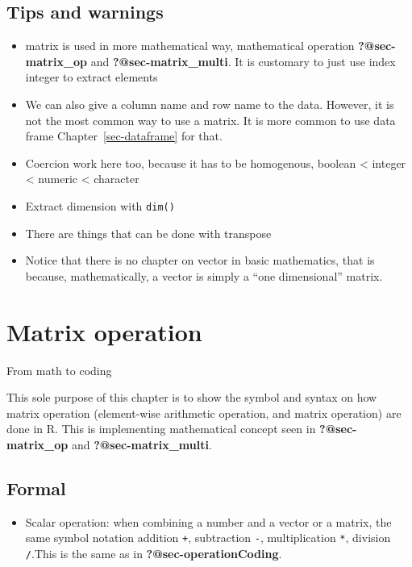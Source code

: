 \documentclass[
  letterpaper,
  DIV=11,
  numbers=noendperiod]{scrreprt}
\providecommand{\tightlist}{%
  \setlength{\itemsep}{0pt}\setlength{\parskip}{0pt}}
\begin{document}
\section*{Tips and warnings}\label{tips-and-warnings-28}


\begin{itemize}
\tightlist
\item
  matrix is used in more mathematical way, mathematical operation
  \textbf{?@sec-matrix\_op} and \textbf{?@sec-matrix\_multi}. It is
  customary to just use index integer to extract elements
\item
  We can also give a column name and row name to the data. However, it
  is not the most common way to use a matrix. It is more common to use
  data frame Chapter~\ref{sec-dataframe} for that.
\item
  Coercion work here too, because it has to be homogenous, boolean
  \textless{} integer \textless{} numeric \textless{} character
\item
  Extract dimension with \texttt{dim()}
\item
  There are things that can be done with transpose
\item
  Notice that there is no chapter on vector in basic mathematics, that
  is because, mathematically, a vector is simply a ``one dimensional''
  matrix.
\end{itemize}

\chapter{Matrix operation}\label{sec-matrixOperationCoding}

From math to coding

This sole purpose of this chapter is to show the symbol and syntax on
how matrix operation (element-wise arithmetic operation, and matrix
operation) are done in R. This is implementing mathematical concept seen
in \textbf{?@sec-matrix\_op} and \textbf{?@sec-matrix\_multi}.

\section*{Formal}\label{formal-36}


\begin{itemize}
\tightlist
\item
  Scalar operation: when combining a number and a vector or a matrix,
  the same symbol notation addition \texttt{+}, subtraction \texttt{-},
  multiplication \texttt{*}, division \texttt{/}.This is the same as in
  \textbf{?@sec-operationCoding}.
\end{itemize}
\end{document}
